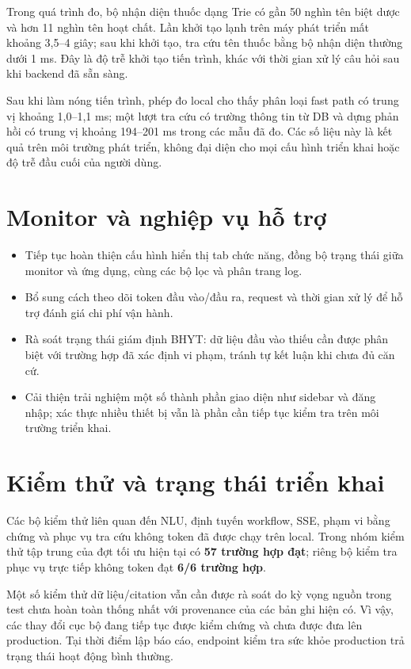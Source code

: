 \documentclass[11pt,a4paper]{article}
\begin{document}
Trong quá trình đo, bộ nhận diện thuốc dạng Trie có gần 50 nghìn tên biệt dược và hơn 11 nghìn tên hoạt chất. Lần khởi tạo lạnh trên máy phát triển mất khoảng 3,5--4 giây; sau khi khởi tạo, tra cứu tên thuốc bằng bộ nhận diện thường dưới 1 ms. Đây là độ trễ khởi tạo tiến trình, khác với thời gian xử lý câu hỏi sau khi backend đã sẵn sàng.

Sau khi làm nóng tiến trình, phép đo local cho thấy phân loại fast path có trung vị khoảng 1,0--1,1 ms; một lượt tra cứu có trường thông tin từ DB và dựng phản hồi có trung vị khoảng 194--201 ms trong các mẫu đã đo. Các số liệu này là kết quả trên môi trường phát triển, không đại diện cho mọi cấu hình triển khai hoặc độ trễ đầu cuối của người dùng.

\section{Monitor và nghiệp vụ hỗ trợ}
\begin{itemize}
    \item Tiếp tục hoàn thiện cấu hình hiển thị tab chức năng, đồng bộ trạng thái giữa monitor và ứng dụng, cùng các bộ lọc và phân trang log.
    \item Bổ sung cách theo dõi token đầu vào/đầu ra, request và thời gian xử lý để hỗ trợ đánh giá chi phí vận hành.
    \item Rà soát trạng thái giám định BHYT: dữ liệu đầu vào thiếu cần được phân biệt với trường hợp đã xác định vi phạm, tránh tự kết luận khi chưa đủ căn cứ.
    \item Cải thiện trải nghiệm một số thành phần giao diện như sidebar và đăng nhập; xác thực nhiều thiết bị vẫn là phần cần tiếp tục kiểm tra trên môi trường triển khai.
\end{itemize}

\section{Kiểm thử và trạng thái triển khai}
Các bộ kiểm thử liên quan đến NLU, định tuyến workflow, SSE, phạm vi bằng chứng và phục vụ tra cứu không token đã được chạy trên local. Trong nhóm kiểm thử tập trung của đợt tối ưu hiện tại có \textbf{57 trường hợp đạt}; riêng bộ kiểm tra phục vụ trực tiếp không token đạt \textbf{6/6 trường hợp}.

Một số kiểm thử dữ liệu/citation vẫn cần được rà soát do kỳ vọng nguồn trong test chưa hoàn toàn thống nhất với provenance của các bản ghi hiện có. Vì vậy, các thay đổi cục bộ đang tiếp tục được kiểm chứng và chưa được đưa lên production. Tại thời điểm lập báo cáo, endpoint kiểm tra sức khỏe production trả trạng thái hoạt động bình thường.
\end{document}
